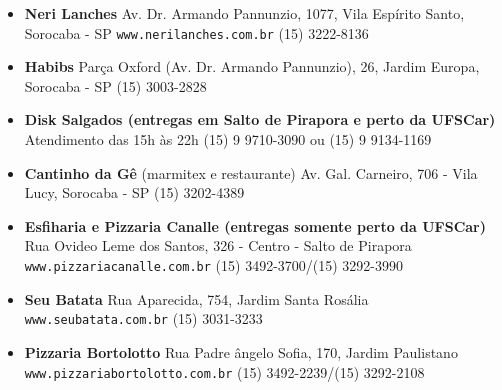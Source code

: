 \begin{multicols}{2}
  \begin{itemize}
    \item \textbf{Neri Lanches}
      \newline Av. Dr. Armando Pannunzio, 1077, Vila Espírito Santo, Sorocaba - SP
      \newline \texttt{www.nerilanches.com.br}
      \newline (15) 3222-8136
  \end{itemize}
  \begin{itemize}
    \item \textbf{Habibs}
      \newline Parça Oxford (Av. Dr. Armando Pannunzio), 26, Jardim Europa, Sorocaba - SP
      \newline (15) 3003-2828
  \end{itemize}
  \begin{itemize}
    \item \textbf{Disk Salgados (entregas em Salto de Pirapora e perto da UFSCar)}
      \newline Atendimento das 15h às 22h
      \newline(15) 9 9710-3090 ou (15) 9 9134-1169
  \end{itemize}
  \begin{itemize}
    \item \textbf{Cantinho da Gê} (marmitex e restaurante)
      \newline Av. Gal. Carneiro, 706 - Vila Lucy, Sorocaba - SP
      \newline (15) 3202-4389
  \end{itemize}
  \begin{itemize}
    \item \textbf{Esfiharia e Pizzaria Canalle (entregas somente perto da UFSCar)}
      \newline Rua Ovideo Leme dos Santos, 326 - Centro - Salto de Pirapora
      \newline \texttt{www.pizzariacanalle.com.br}
      \newline (15) 3492-3700/(15) 3292-3990
  \end{itemize}
  \begin{itemize}
    \item \textbf{Seu Batata}
      \newline Rua Aparecida, 754, Jardim Santa Rosália
      \newline \texttt{www.seubatata.com.br}
      \newline (15) 3031-3233
  \end{itemize}
  \begin{itemize}
    \item \textbf{Pizzaria Bortolotto}
      \newline Rua Padre ângelo Sofia, 170, Jardim Paulistano
      \newline \texttt{www.pizzariabortolotto.com.br}
      \newline (15) 3492-2239/(15) 3292-2108
  \end{itemize}
\end{multicols}

